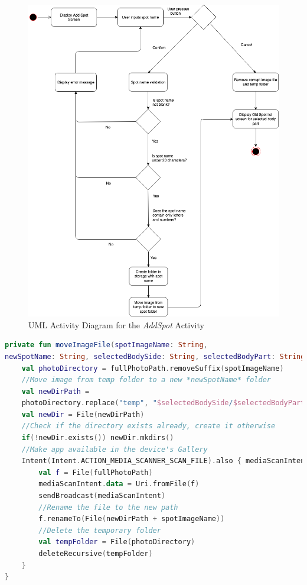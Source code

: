 \begin{figure}
    \includegraphics[width=1.2\textwidth, center]{figures/AddSpot.png}
    \caption{UML Activity Diagram for the \emph{AddSpot} Activity}
    \label{fig:AddSpot}
\end{figure}

\begin{lstlisting}[caption={Adding a Spot}, label={lst:addSpot}, language=Kotlin]
private fun moveImageFile(spotImageName: String, 
newSpotName: String, selectedBodySide: String, selectedBodyPart: String) {
    val photoDirectory = fullPhotoPath.removeSuffix(spotImageName)
    //Move image from temp folder to a new *newSpotName* folder
    val newDirPath = 
    photoDirectory.replace("temp", "$selectedBodySide/$selectedBodyPart/$newSpotName")
    val newDir = File(newDirPath)
    //Check if the directory exists already, create it otherwise
    if(!newDir.exists()) newDir.mkdirs()
    //Make app available in the device's Gallery
    Intent(Intent.ACTION_MEDIA_SCANNER_SCAN_FILE).also { mediaScanIntent ->
        val f = File(fullPhotoPath)
        mediaScanIntent.data = Uri.fromFile(f)
        sendBroadcast(mediaScanIntent)
        //Rename the file to the new path
        f.renameTo(File(newDirPath + spotImageName))
        //Delete the temporary folder
        val tempFolder = File(photoDirectory)
        deleteRecursive(tempFolder)
    }
}
\end{lstlisting}

